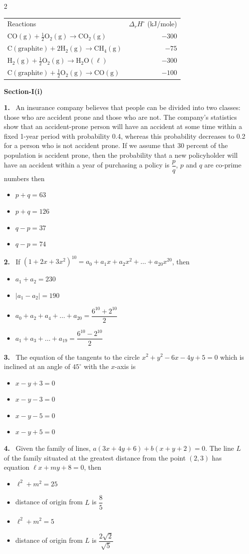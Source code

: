 \documentclass[10pt]{extarticle}
\newcommand{\partsec}[2]{\par\medskip\noindent{\large\bfseries PART-#1: #2}\par\smallskip}
\newcommand{\sect}[1]{\par\smallskip\noindent\textbf{#1}\par}
\newcommand{\qn}[1]{\par\smallskip\noindent\textbf{#1.}~}
\newenvironment{qoptions}{\begin{itemize}[leftmargin=1.8em,itemsep=1pt,topsep=2pt,label={}]}{\end{itemize}}
\newcommand{\opt}[2]{\item[(#1)] #2}
\begin{document}
\begin{multicols}{2}
\begin{center}
\begin{tabular}{lr}
Reactions & $\Delta_rH^\circ$ (kJ/mole)\\
$\mathrm{CO(g)}+\frac12\mathrm{O_2(g)}\to\mathrm{CO_2(g)}$ & $-300$\\
$\mathrm{C(graphite)}+2\mathrm{H_2(g)}\to\mathrm{CH_4(g)}$ & $-75$\\
$\mathrm{H_2(g)}+\frac12\mathrm{O_2(g)}\to\mathrm{H_2O(\ell)}$ & $-300$\\
$\mathrm{C(graphite)}+\frac12\mathrm{O_2(g)}\to\mathrm{CO(g)}$ & $-100$\\
\end{tabular}
\end{center}
\partsec{3}{MATHEMATICS}
\sect{Section-I(i)}
\qn{1} An insurance company believes that people can be divided into two classes: those who are accident prone and those who are not. The company's statistics show that an accident-prone person will have an accident at some time within a fixed 1-year period with probability 0.4, whereas this probability decreases to 0.2 for a person who is not accident prone. If we assume that 30 percent of the population is accident prone, then the probability that a new policyholder will have an accident within a year of purchasing a policy is $\dfrac{p}{q}$, $p$ and $q$ are co-prime numbers then
\begin{qoptions}
\opt{A}{$p+q=63$}
\opt{B}{$p+q=126$}
\opt{C}{$q-p=37$}
\opt{D}{$q-p=74$}
\end{qoptions}
\qn{2} If $(1+2x+3x^2)^{10}=a_0+a_1x+a_2x^2+\ldots+a_{20}x^{20}$, then
\begin{qoptions}
\opt{A}{$a_1+a_2=230$}
\opt{B}{$|a_1-a_2|=190$}
\opt{C}{$a_0+a_2+a_4+\ldots+a_{20}=\dfrac{6^{10}+2^{10}}{2}$}
\opt{D}{$a_1+a_3+\ldots+a_{19}=\dfrac{6^{10}-2^{10}}{2}$}
\end{qoptions}
\qn{3} The equation of the tangents to the circle $x^2+y^2-6x-4y+5=0$ which is inclined at an angle of $45^\circ$ with the $x$-axis is
\begin{qoptions}
\opt{A}{$x-y+3=0$}
\opt{B}{$x-y-3=0$}
\opt{C}{$x-y-5=0$}
\opt{D}{$x-y+5=0$}
\end{qoptions}
\qn{4} Given the family of lines, $a(3x+4y+6)+b(x+y+2)=0$. The line $L$ of the family situated at the greatest distance from the point $(2,3)$ has equation $\ell x+my+8=0$, then
\begin{qoptions}
\opt{A}{$\ell^2+m^2=25$}
\opt{B}{distance of origin from $L$ is $\dfrac85$}
\opt{C}{$\ell^2+m^2=5$}
\opt{D}{distance of origin from $L$ is $\dfrac{2\sqrt2}{\sqrt5}$}

\end{qoptions}
\end{multicols}
\end{document}
